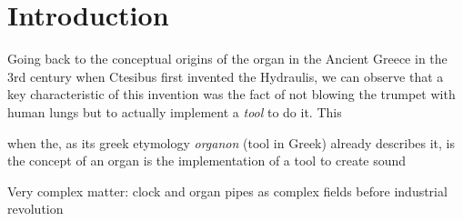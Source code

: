 \chapter{Introduction}

Going back to the conceptual origins of the organ in the Ancient Greece in the 3rd century when Ctesibus first invented the Hydraulis, we can observe that a key characteristic of this invention was the fact of not blowing the trumpet with human lungs but to actually implement a \textit{tool} to do it. This


  when the, as its greek etymology \textit{organon} (tool in Greek) already describes it, is the concept of an organ is the implementation of a tool to create sound 

Very complex matter: clock and organ pipes as complex fields before industrial revolution 

